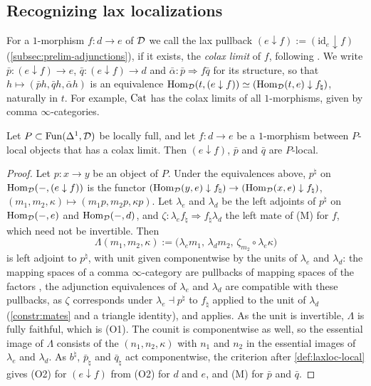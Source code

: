 \subsection{Recognizing lax localizations}
\label{subsec:laxloc-recognition}

%
For a $1$-morphism $f\colon d \to e$ of $\mathcal{D}$ we call the lax pullback
$(e \downarrow f) := (\mathrm{id}_{e} \downarrow f)$
(\cref{subsec:prelim-adjunctions}), if it exists, the \emph{colax limit} of $f$,
following \cite[\S 2.3]{bourke2025recognition}. We write
$\bar{p}\colon (e \downarrow f) \to e$,
$\bar{q}\colon (e \downarrow f) \to d$
and
$\bar{\alpha}\colon \bar{p} \Rightarrow f\bar{q}$
for its structure, so that
$h \mapsto (\bar{p}h,\bar{q}h,\bar{\alpha}h)$
is an equivalence
$\operatorname{Hom}_{\mathcal{D}}(t,(e \downarrow f)) \simeq (\operatorname{Hom}_{\mathcal{D}}(t,e) \downarrow f_{\natural})$,
naturally in $t$. For example, $\mathrm{Cat}$ has the colax limits of all
$1$-morphisms, given by comma $\infty$-categories.

\begin{lem}
\label{lem:laxloc-colax-limits}
%
Let
$P \subset \operatorname{Fun}(\Delta^{1},\mathcal{D})$
be locally full, and let $f\colon d \to e$ be a $1$-morphism between $P$-local
objects that has a colax limit. Then $(e \downarrow f)$, $\bar{p}$ and $\bar{q}$
are $P$-local.
\end{lem}

\begin{proof}
%
Let $p\colon x \to y$ be an object of $P$. Under the equivalences above,
$p^{\natural}$ on
$\operatorname{Hom}_{\mathcal{D}}(-,(e \downarrow f))$
is the functor
$(\operatorname{Hom}_{\mathcal{D}}(y,e) \downarrow f_{\natural}) \to (\operatorname{Hom}_{\mathcal{D}}(x,e) \downarrow
f_{\natural})$,
$(m_{1},m_{2},\kappa) \mapsto (m_{1}p,m_{2}p,\kappa p)$.
Let $\lambda_{e}$ and $\lambda_{d}$ be the left adjoints of $p^{\natural}$ on
$\operatorname{Hom}_{\mathcal{D}}(-,e)$ and $\operatorname{Hom}_{\mathcal{D}}(-,d)$, and
$\zeta\colon \lambda_{e}f_{\natural} \Rightarrow f_{\natural}\lambda_{d}$
the left mate of (M) for $f$, which need not be invertible. Then
\begin{equation*}
\Lambda(m_{1},m_{2},\kappa) := \bigl(\lambda_{e}m_{1},\,\lambda_{d}m_{2},\,
\zeta_{m_{2}} \circ \lambda_{e}\kappa\bigr)
\end{equation*}
is left adjoint to $p^{\natural}$, with unit given componentwise by the units of
$\lambda_{e}$ and $\lambda_{d}$: the mapping spaces of a comma $\infty$-category
are pullbacks of mapping spaces of the factors , the adjunction
equivalences of $\lambda_{e}$ and $\lambda_{d}$ are compatible with these
pullbacks, as $\zeta$ corresponds under
$\lambda_{e} \dashv p^{\natural}$
to $f_{\natural}$ applied to the unit of $\lambda_{d}$ (\cref{constr:mates} and
a triangle identity), and \cite[Prop.~5.2.2.8]{htt} applies. As the unit is
invertible, $\Lambda$ is fully faithful, which is (O1). The counit is
componentwise as well, so the essential image of $\Lambda$ consists of the
$(n_{1},n_{2},\kappa)$ with $n_{1}$ and $n_{2}$ in the essential images of
$\lambda_{e}$ and $\lambda_{d}$. As $b^{\natural}$, $\bar{p}_{\natural}$ and
$\bar{q}_{\natural}$ act componentwise, the criterion after
\cref{def:laxloc-local} gives (O2) for $(e \downarrow f)$ from (O2) for $d$ and
$e$, and (M) for $\bar{p}$ and $\bar{q}$.
\end{proof}

